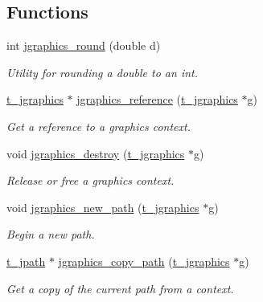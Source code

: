 \subsection*{Functions}
\begin{DoxyCompactItemize}
\item 
int \hyperlink{group__jgraphics_ga706be120b247818f2ebb18d96934bb72}{jgraphics\_\-round} (double d)
\begin{DoxyCompactList}\small\item\em Utility for rounding a double to an int. \item\end{DoxyCompactList}\item 
\hyperlink{group__jgraphics_ga4bf27bd7e21a59a427481b909d4656e7}{t\_\-jgraphics} $\ast$ \hyperlink{group__jgraphics_ga3008118a280cac02b4c64ab6d0e6926e}{jgraphics\_\-reference} (\hyperlink{group__jgraphics_ga4bf27bd7e21a59a427481b909d4656e7}{t\_\-jgraphics} $\ast$g)
\begin{DoxyCompactList}\small\item\em Get a reference to a graphics context. \item\end{DoxyCompactList}\item 
void \hyperlink{group__jgraphics_ga910977684c0f03be9edfb9f861905d5e}{jgraphics\_\-destroy} (\hyperlink{group__jgraphics_ga4bf27bd7e21a59a427481b909d4656e7}{t\_\-jgraphics} $\ast$g)
\begin{DoxyCompactList}\small\item\em Release or free a graphics context. \item\end{DoxyCompactList}\item 
void \hyperlink{group__jgraphics_ga627c4feb0dfcad9e8417472eec5aedef}{jgraphics\_\-new\_\-path} (\hyperlink{group__jgraphics_ga4bf27bd7e21a59a427481b909d4656e7}{t\_\-jgraphics} $\ast$g)
\begin{DoxyCompactList}\small\item\em Begin a new path. \item\end{DoxyCompactList}\item 
\hyperlink{group__jgraphics_ga09a18e946c8a6cfa25dfa38154a138d8}{t\_\-jpath} $\ast$ \hyperlink{group__jgraphics_ga356f39bed1d63fcf843fe05b6dc861b0}{jgraphics\_\-copy\_\-path} (\hyperlink{group__jgraphics_ga4bf27bd7e21a59a427481b909d4656e7}{t\_\-jgraphics} $\ast$g)
\begin{DoxyCompactList}\small\item\em Get a copy of the current path from a context. \item\end{DoxyCompactList}\item 

\end{DoxyCompactItemize}
